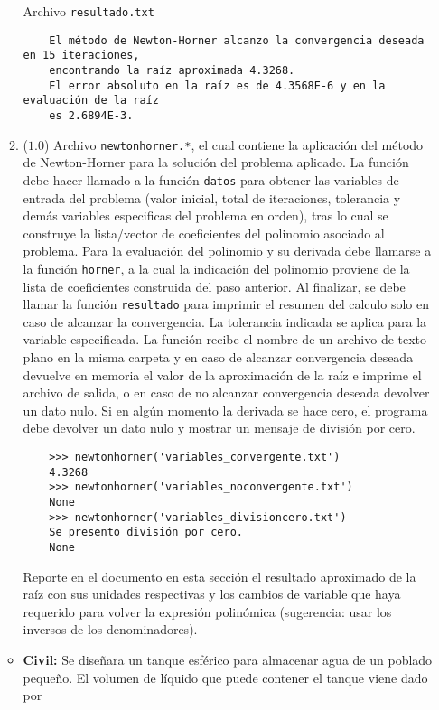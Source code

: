\documentclass[12pt]{article}
\begin{document}
\begin{enumerate}[leftmargin=*,widest=9]
\begin{enumerate}[label=\alph*]
    Archivo \verb-resultado.txt-
    \begin{verbatim}
    El método de Newton-Horner alcanzo la convergencia deseada en 15 iteraciones,
    encontrando la raíz aproximada 4.3268.
    El error absoluto en la raíz es de 4.3568E-6 y en la evaluación de la raíz
    es 2.6894E-3.
    \end{verbatim}
    \item (\(1.0\)) Archivo \verb-newtonhorner.*-, el cual contiene la aplicación del método de Newton-Horner para la solución del problema aplicado. La función debe hacer llamado a la función \verb-datos- para obtener las variables de entrada del problema (valor inicial, total de iteraciones, tolerancia y demás variables especificas del problema en orden), tras lo cual se construye la lista/vector de coeficientes del polinomio asociado al problema. Para la evaluación del polinomio y su derivada debe llamarse a la función \verb-horner-, a la cual la indicación del polinomio proviene de la lista de coeficientes construida del paso anterior. Al finalizar, se debe llamar la función \verb-resultado- para imprimir el resumen del calculo solo en caso de alcanzar la convergencia.
La tolerancia indicada se aplica para la variable especificada.
La función recibe el nombre de un archivo de texto plano en la misma carpeta y en caso de alcanzar convergencia deseada devuelve en memoria el valor de la aproximación de la raíz e imprime el archivo de salida, o en caso de no alcanzar convergencia deseada devolver un dato nulo. Si en algún momento la derivada se hace cero, el programa debe devolver un dato nulo y mostrar un mensaje de división por cero.
    \begin{verbatim}
    >>> newtonhorner('variables_convergente.txt')
    4.3268
    >>> newtonhorner('variables_noconvergente.txt')
    None
    >>> newtonhorner('variables_divisioncero.txt')
    Se presento división por cero.
    None
    \end{verbatim}
    Reporte en el documento en esta sección el resultado aproximado de la raíz con sus unidades respectivas y los cambios de variable que haya requerido para volver la expresión polinómica (sugerencia: usar los inversos de los denominadores).
    \end{enumerate}
    \begin{itemize}
    \item \textbf{Civil:}  Se diseñara un tanque esférico para almacenar agua de un poblado pequeño. El volumen de líquido que puede contener el tanque viene dado por
    \begin{equation*}

\end{equation*}
\end{itemize}
\end{enumerate}
\end{document}
